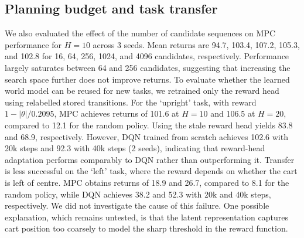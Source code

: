 \documentclass[conference]{IEEEtran}
\begin{document}
\subsection{Planning budget and task transfer}
We also evaluated the effect of the number of candidate sequences on MPC performance for $H{=}10$ across 3 seeds. Mean returns are 94.7, 103.4, 107.2, 105.3, and 102.8 for 16, 64, 256, 1024, and 4096 candidates, respectively. Performance largely saturates between 64 and 256 candidates, suggesting that increasing the search space further does not improve returns. To evaluate whether the learned world model can be reused for new tasks, we retrained only the reward head using relabelled stored transitions. For the `upright' task, with reward $1-|\theta|/0.2095$, MPC achieves returns of 101.6 at $H{=}10$ and 106.5 at $H{=}20$, compared to 12.1 for the random policy. Using the stale reward head yields 83.8 and 68.9, respectively. However, DQN trained from scratch achieves 102.6 with 20k steps and 92.3 with 40k steps (2 seeds), indicating that reward-head adaptation performs comparably to DQN rather than outperforming it. Transfer is less successful on the `left' task, where the reward depends on whether the cart is left of centre. MPC obtains returns of 18.9 and 26.7, compared to 8.1 for the random policy, while DQN achieves 38.2 and 52.3 with 20k and 40k steps, respectively. We did not investigate the cause of this failure. One possible explanation, which remains untested, is that the latent representation captures cart position too coarsely to model the sharp threshold in the reward function.
\end{document}
